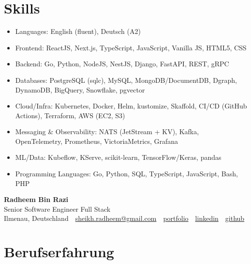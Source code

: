 \documentclass[10pt,a4paper]{resume}
\makeatletter
\newcommand{\Portfolio}{https://radheem.github.io/my-cv}
\newcommand{\PortfolioText}{portfolio}
\newcommand{\GitHub}{https://github.com/radheem}
\newcommand{\LinkedIn}{https://www.linkedin.com/in/radheem-razi}
\newcommand{\Email}{sheikh.radheem@gmail.com}
\makeatother
\begin{document}
\section{Skills}

\begin{itemize}[leftmargin=1.4em,nosep,topsep=2pt]
  \item Languages: English (fluent), Deutsch (A2)
  \item Frontend: ReactJS, Next.js, TypeScript, JavaScript, Vanilla JS, HTML5, CSS
  \item Backend: Go, Python, NodeJS, NestJS, Django, FastAPI, REST, gRPC
  \item Databases: PostgreSQL (sqlc), MySQL, MongoDB/DocumentDB, Dgraph, DynamoDB, BigQuery, Snowflake, pgvector
  \item Cloud/Infra: Kubernetes, Docker, Helm, kustomize, Skaffold, CI/CD (GitHub Actions), Terraform, AWS (EC2, S3)
  \item Messaging \& Observability: NATS (JetStream + KV), Kafka, OpenTelemetry, Prometheus, VictoriaMetrics, Grafana
  \item ML/Data: Kubeflow, KServe, scikit-learn, TensorFlow/Keras, pandas
  \item Programming Languages: Go, Python, SQL, TypeScript, JavaScript, Bash, PHP
\end{itemize}

\clearpage
{}

\begin{center}
  {\huge\bfseries Radheem Bin Razi}\\[3pt]
  {\large Senior Software Engineer Full Stack}\\[6pt]
  \small
  Ilmenau, Deutschland \,\textbar\,
  \href{mailto:\Email}{\Email} \,\textbar\,
  \href{\Portfolio}{\PortfolioText} \,\textbar\,
  \href{\LinkedIn}{linkedin} \,\textbar\,
  \href{\GitHub}{github}
\end{center}
\vspace{2pt}

\section{Berufserfahrung}
\end{document}
